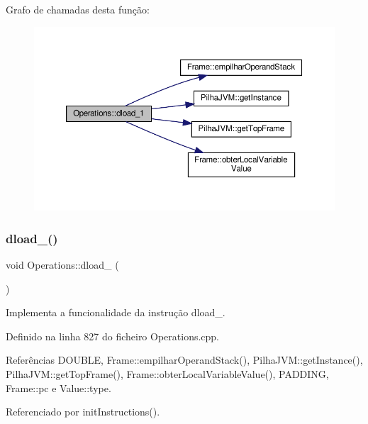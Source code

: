 Grafo de chamadas desta função\+:
\nopagebreak
\begin{figure}[H]
\begin{center}
\leavevmode
\includegraphics[width=350pt]{classOperations_a64632251d88964ff4da0d981103e099c_cgraph}
\end{center}
\end{figure}
\mbox{\label{classOperations_a55b89c1780e7f91ad7b6da5747d8c6ba}} 
\subsubsection{\texorpdfstring{dload\+\_()}{dload\_2()}}
{\footnotesize\ttfamily void Operations\+::dload\+\_ (\begin{DoxyParamCaption}{ }\end{DoxyParamCaption})\hspace{0.3cm}{\ttfamily [private]}}



Implementa a funcionalidade da instrução dload\+\_. 



Definido na linha 827 do ficheiro Operations.\+cpp.



Referências D\+O\+U\+B\+LE, Frame\+::empilhar\+Operand\+Stack(), Pilha\+J\+V\+M\+::get\+Instance(), Pilha\+J\+V\+M\+::get\+Top\+Frame(), Frame\+::obter\+Local\+Variable\+Value(), P\+A\+D\+D\+I\+NG, Frame\+::pc e Value\+::type.



Referenciado por init\+Instructions().


